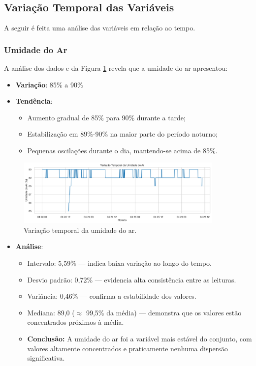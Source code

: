 \documentclass[12pt, a4paper]{article}
\begin{document}
\subsection{Variação Temporal das Variáveis}
A seguir é feita uma análise das variáveis em relação ao tempo.

\subsubsection{Umidade do Ar}
A análise dos dados e da Figura \ref{fig:temporal_umidadear} revela que a umidade do ar apresentou:
\begin{itemize}
    \item \textbf{Variação}: 85\% a 90\%
    \item \textbf{Tendência}:
    \begin{itemize}
        \item Aumento gradual de 85\% para 90\% durante a tarde;
        \item Estabilização em 89\%-90\% na maior parte do período noturno;
        \item Pequenas oscilações durante o dia, mantendo-se acima de 85\%.
    \end{itemize}
\end{itemize}

\begin{figure}[H]
\centering
\includegraphics[width=0.9\textwidth]{graficos/temporal_umidadear.png}
\caption{Variação temporal da umidade do ar.}
\label{fig:temporal_umidadear}
\end{figure}

\begin{itemize}
    \item \textbf{Análise}:
        \begin{itemize}
            \item Intervalo: 5{,}59\% — indica baixa variação ao longo do tempo.
            \item Desvio padrão: 0{,}72\% — evidencia alta consistência entre as leituras.
            \item Variância: 0{,}46\% — confirma a estabilidade dos valores.
            \item Mediana: 89{,}0 ($\approx$ 99{,}5\% da média) — demonstra que os valores estão concentrados próximos à média.
            \item \textbf{Conclusão:} A umidade do ar foi a variável mais estável do conjunto, com valores altamente concentrados e praticamente nenhuma dispersão significativa.
        \end{itemize}
\end{itemize}
\end{document}
